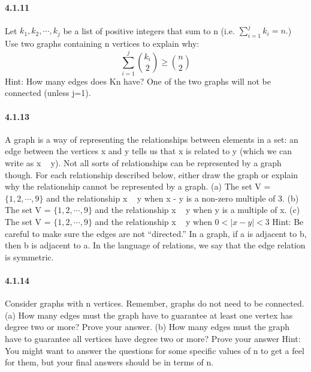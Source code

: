 \documentclass{article}
\begin{document}
\paragraph{4.1.11}
Let $k_1,k_2,\cdots,k_j$ be a list of positive integers that sum to n (i.e. $\sum_{i=1}^{j}k_i=n.$) Use two graphs containing n vertices to explain why:
$$\sum_{i=1}^j\binom{k_i}{2}\ge \binom{n}{2}$$\newline
Hint:\newline
How many edges does Kn have? One of the two graphs will not
be connected (unless j=1).
\paragraph{4.1.13}
A graph is a way of representing the relationships between elements
in a set: an edge between the vertices x and y tells us that x is related
to y (which we can write as x ~ y). Not all sorts of relationships can
be represented by a graph though. For each relationship described
below, either draw the graph or explain why the relationship cannot
be represented by a graph.\newline
(a) The set V = $\{1, 2, \cdots, 9\}$ and the relationship x ~ y when x - y
is a non-zero multiple of 3.\newline
(b) The set V = $\{1, 2, \cdots , 9\}$ and the relationship x ~ y when y is a
multiple of x.\newline
(c) The set V = $\{1, 2, \cdots , 9\}$ and the relationship x ~ y when
$0 < |x - y| < 3$\newline
Hint:\newline
Be careful to make sure the edges are not “directed.” In a graph, if
a is adjacent to b, then b is adjacent to a. In the language of relations, we
say that the edge relation is symmetric.
\paragraph{4.1.14}
Consider graphs with n vertices. Remember, graphs do not need to be
connected.\newline
(a) How many edges must the graph have to guarantee at least one
vertex has degree two or more? Prove your answer.\newline
(b) How many edges must the graph have to guarantee all vertices
have degree two or more? Prove your answer\newline
Hint:\newline
You might want to answer the questions for some specific values
of n to get a feel for them, but your final answers should be in terms of n.
\end{document}

